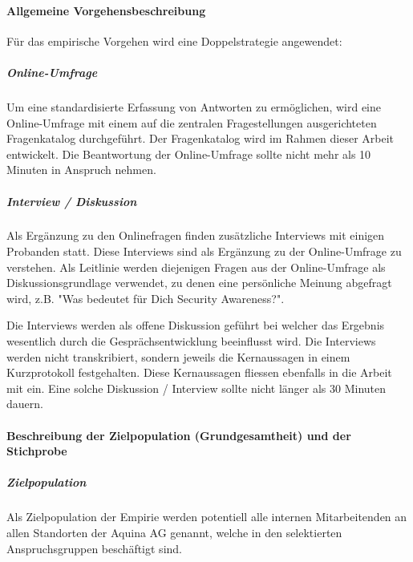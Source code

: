 \paragraph*{Allgemeine Vorgehensbeschreibung}\mbox{}

Für das empirische Vorgehen wird eine Doppelstrategie angewendet:

\subparagraph*{Online-Umfrage}\mbox{}

\begin{sloppypar}
Um eine standardisierte Erfassung von Antworten zu ermöglichen, wird eine Online-Umfrage mit einem auf die zentralen Fragestellungen ausgerichteten Fragenkatalog durchgeführt. Der Fragenkatalog wird im Rahmen dieser Arbeit entwickelt. Die Beantwortung der Online-Umfrage sollte nicht mehr als 10 Minuten in Anspruch nehmen.
\end{sloppypar}

\subparagraph*{Interview / Diskussion}\mbox{}

\begin{sloppypar}
Als Ergänzung zu den Onlinefragen finden zusätzliche Interviews mit einigen Probanden statt. Diese Interviews sind als Ergänzung zu der Online-Umfrage zu verstehen. Als Leitlinie werden diejenigen Fragen aus der Online-Umfrage als Diskussionsgrundlage verwendet, zu denen eine persönliche Meinung abgefragt wird, z.B. "Was bedeutet für Dich Security Awareness?".

Die Interviews werden als offene Diskussion geführt bei welcher das Ergebnis wesentlich durch die Gesprächsentwicklung beeinflusst wird. Die Interviews werden nicht transkribiert, sondern jeweils die Kernaussagen in einem Kurzprotokoll festgehalten. Diese Kernaussagen fliessen ebenfalls in die Arbeit mit ein. Eine solche Diskussion / Interview sollte nicht länger als 30 Minuten dauern.
\end{sloppypar}

\paragraph*{Beschreibung der Zielpopulation (Grundgesamtheit) und der Stichprobe}\mbox{}

\subparagraph*{Zielpopulation}\mbox{}

\begin{sloppypar}
Als Zielpopulation der Empirie werden potentiell alle internen Mitarbeitenden an allen Standorten der Aquina AG genannt, welche in den selektierten Anspruchsgruppen beschäftigt sind.
\end{sloppypar}

